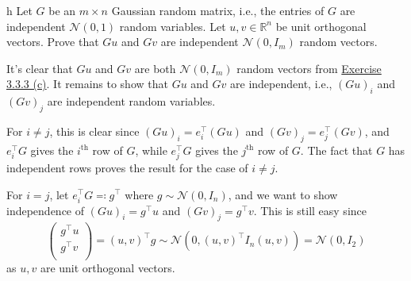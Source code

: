 \begin{problem*}[Exercise 3.3.6]h\label{ex3.3.6}
	Let \(G\) be an \(m \times n\) Gaussian random matrix, i.e., the entries of \(G\) are independent \(\mathcal{N} (0, 1)\) random variables. Let \(u, v \in \mathbb{R} ^n\) be unit orthogonal vectors. Prove that \(Gu\) and \(Gv\) are independent \(\mathcal{N} (0, I_m)\) random vectors.
\end{problem*}
\begin{answer}
	It's clear that \(Gu\) and \(Gv\) are both \(\mathcal{N} (0, I_m)\) random vectors from \hyperref[ex3.3.3:c]{Exercise 3.3.3 (c)}. It remains to show that \(Gu\) and \(Gv\) are independent, i.e., \((Gu)_i\) and \((Gv)_j\) are independent random variables.

	For \(i \neq j\), this is clear since \((Gu)_i = e_i ^{\top} (Gu)\) and \((Gv)_j = e_j ^{\top} (Gv)\), and \(e_i ^{\top} G\) gives the \(i^{\text{th} } \) row of \(G\), while \(e_j ^{\top} G\) gives the \(j^{\text{th} } \) row of \(G\). The fact that \(G\) has independent rows proves the result for the case of \(i \neq j\).

	For \(i = j\), let \(e_i ^{\top} G \eqqcolon g^{\top} \) where \(g \sim \mathcal{N} (0, I_n)\), and we want to show independence of \((Gu)_i = g^{\top} u\) and \((Gv)_j = g^{\top} v\). This is still easy since
	\[
		\begin{pmatrix}
			g^{\top} u \\
			g^{\top} v \\
		\end{pmatrix}
		= (u, v)^{\top} g
		\sim \mathcal{N} (0, (u, v)^{\top} I_n (u, v))
		= \mathcal{N} (0, I_2)
	\]
	as \(u, v\) are unit orthogonal vectors.
\end{answer}

